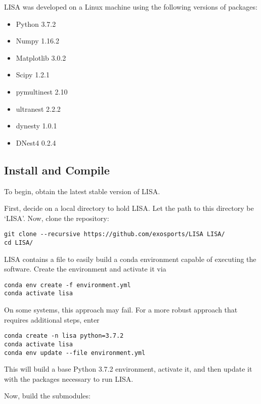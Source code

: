 \documentclass[letterpaper, 12pt]{article}
\begin{document}
\noindent LISA was developed on a Linux machine using the following 
versions of packages:

\begin{itemize}
\item Python 3.7.2
\item Numpy 1.16.2
\item Matplotlib 3.0.2
\item Scipy 1.2.1
\item pymultinest 2.10
\item ultranest 2.2.2
\item dynesty 1.0.1
\item DNest4 0.2.4
\end{itemize}


\subsection{Install and Compile}
\label{sec:install}

\noindent To begin, obtain the latest stable version of LISA.  \newline

\noindent First, decide on a local directory to hold LISA.  Let the path to this directory 
be `LISA'.  Now, clone the repository:
\begin{verbatim}
git clone --recursive https://github.com/exosports/LISA LISA/
cd LISA/
\end{verbatim}

\noindent LISA contains a file to easily build a conda environment capable of 
executing the software.  Create the environment and activate it via

\begin{verbatim}
conda env create -f environment.yml
conda activate lisa
\end{verbatim}

\noindent On some systems, this approach may fail.  For a more robust approach that 
requires additional steps, enter

\begin{verbatim}
conda create -n lisa python=3.7.2
conda activate lisa
conda env update --file environment.yml
\end{verbatim}

\noindent This will build a base Python 3.7.2 environment, activate it, and then update 
it with the packages necessary to run LISA.\newline

\noindent Now, build the submodules:
\end{document}

